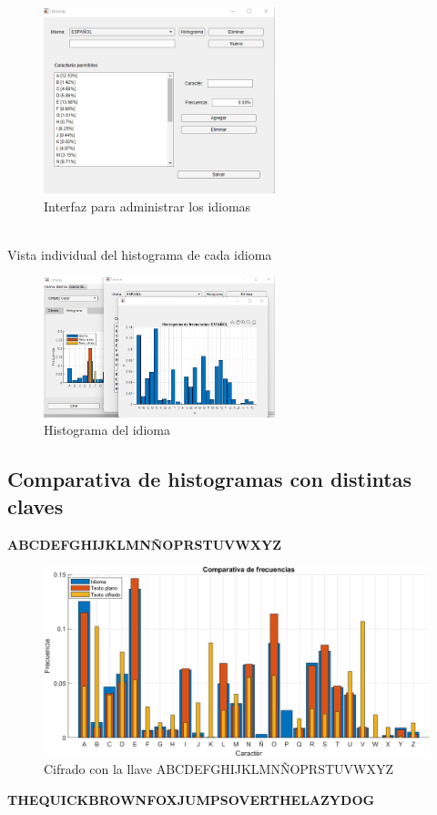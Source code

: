 \documentclass[10pt]{article}
\begin{document}
\begin{figure}[!ht]
  \centering
  \includegraphics[width=0.6\textwidth]{GUI_3}
  \caption{Interfaz para administrar los idiomas}
  \label{fig_sim}
\end{figure}
\\
Vista individual del histograma de cada idioma
\begin{figure}[!ht]
  \centering
  \includegraphics[width=0.6\textwidth]{GUI_4}
  \caption{Histograma del idioma}
  \label{fig_sim}
\end{figure}

\newpage

\subsection{Comparativa de histogramas con distintas claves}


\textbf{ABCDEFGHIJKLMNÑOPRSTUVWXYZ}
\begin{figure}[!ht]
  \centering
  \includegraphics[width=1\textwidth]{PlayFairAlphabet}
  \caption{Cifrado con la llave ABCDEFGHIJKLMNÑOPRSTUVWXYZ}
  \label{fig_sim}
\end{figure}
\newpage
\textbf{THEQUICKBROWNFOXJUMPSOVERTHELAZYDOG}
\end{document}
